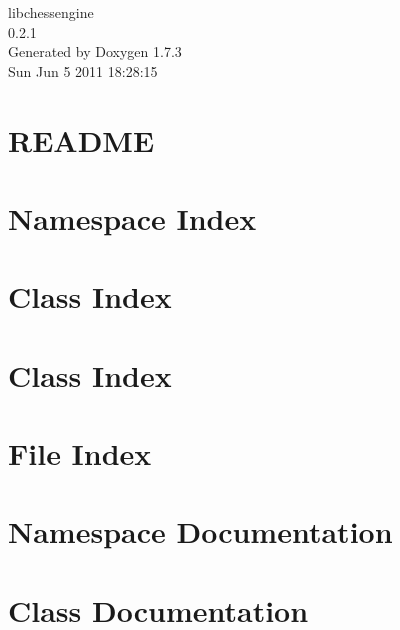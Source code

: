 \documentclass[a4paper]{book}
\begin{document}
\hypersetup{pageanchor=false}
\begin{titlepage}
\vspace*{7cm}
\begin{center}
{\Large libchessengine \\[1ex]\large 0.2.1 }\\
\vspace*{1cm}
{\large Generated by Doxygen 1.7.3}\\
\vspace*{0.5cm}
{\small Sun Jun 5 2011 18:28:15}\\
\end{center}
\end{titlepage}
\clearemptydoublepage
{}
\tableofcontents
\clearemptydoublepage
{}
\hypersetup{pageanchor=true}
\chapter{README}
\label{README}
\hypertarget{README}{}

\chapter{Namespace Index}

\chapter{Class Index}

\chapter{Class Index}

\chapter{File Index}

\chapter{Namespace Documentation}


\chapter{Class Documentation}






























\end{document}
